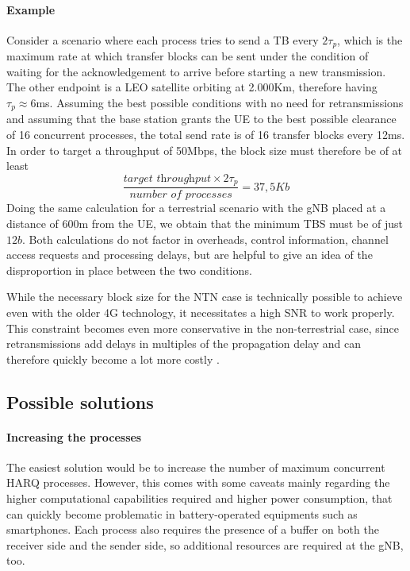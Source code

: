 \paragraph{Example} Consider a scenario where each process tries to send a \ac{TB} every $2\tau_p$, which is the maximum rate at which transfer blocks can be sent under the condition of waiting for the acknowledgement to arrive before starting a new transmission. The other endpoint is a \ac{LEO} satellite orbiting at 2.000Km, therefore having $\tau_p\approx6$ms. Assuming the best possible conditions with no need for retransmissions and assuming that the base station grants the \ac{UE} to the best possible clearance of 16 concurrent processes, the total send rate is of 16 transfer blocks every 12ms. In order to target a throughput of 50Mbps, the block size must therefore be of at least $$\frac{\textit{target throughput} \times 2\tau_p}{\textit{number of processes}} = 37,5Kb$$
Doing the same calculation for a terrestrial scenario with the \ac{gNB} placed at a distance of 600m from the \ac{UE}, we obtain that the minimum \ac{TBS} must be of just $12b$.
Both calculations do not factor in overheads, control information, channel access requests and processing delays, but are helpful to give an idea of the disproportion in place between the two conditions.

While the necessary block size for the \ac{NTN} case is technically possible to achieve even with the older 4G technology, it necessitates a high \ac{SNR} to work properly. This constraint becomes even more conservative in the non-terrestrial case, since retransmissions add delays in multiples of the propagation delay and can therefore quickly become a lot more costly \cite{4g-phy-processing-sharetechnote}.

\subsection{Possible solutions}
\label{sec:proc-harq-prop-sol}
\paragraph{Increasing the processes}
The easiest solution would be to increase the number of maximum concurrent \ac{HARQ} processes. However, this comes with some caveats mainly regarding the higher computational capabilities required and higher power consumption, that can quickly become problematic in battery-operated equipments such as smartphones. Each process also requires the presence of a buffer on both the receiver side and the sender side, so additional resources are required at the \ac{gNB}, too. 
